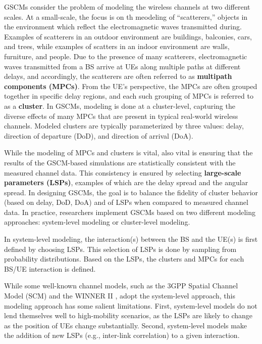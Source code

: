 GSCMs consider the problem of modeling the wireless channels at two different scales. At a small-scale, the focus is on th meodeling of ``scatterers,'' objects in the environment which reflect the electromagnetic waves transmitted during. Examples of scatterers in an outdoor environment are buildings, balconies, cars, and trees, while examples of scatters in an indoor environment are walls, furniture, and people. Due to the presence of many scatterers, electromagnetic waves transmitted from a BS arrive at UEs along multiple paths at different delays, and accordingly, the scatterers are often referred to as \textbf{multipath components (MPCs)}. From the UE's perspective, the MPCs are often grouped together in specific delay regions, and each such grouping of MPCs is referred to as a \textbf{cluster}. In GSCMs, modeling is done at a cluster-level, capturing the diverse effects of many MPCs that are present in typical real-world wireless channels. Modeled clusters are typically parameterized by three values: delay, direction of departure (DoD), and direction of arrival (DoA).  

While the modeling of MPCs and clusters is vital, also vital is ensuring that the results of the GSCM-based simulations are statistically consistent with the measured channel data. This consistency is ensured by selecting \textbf{large-scale parameters (LSPs)}, examples of which are the delay spread and the angular spread. In designing GSCMs, the goal is to balance the fidelity of cluster behavior (based on delay, DoD, DoA) and of LSPs when compared to measured channel data. In practice, researchers implement GSCMs based on two different modeling approaches: system-level modeling or cluster-level modeling.

In system-level modeling, the interaction(s) between the BS and the UE(s) is first defined by choosing LSPs. This selection of LSPs is done by sampling from probability distributions. Based on the LSPs, the clusters and MPCs for each BS/UE interaction is defined.

While some well-known channel models, such as the 3GPP Spatial Channel Model (SCM) \cite{ref:kyosti2007winner} and the WINNER II \cite{ref:kyosti2007winner}, adopt the system-level approach, this modeling approach has some salient limitations. First, system-level models do not lend themselves well to high-mobility scenarios, as the LSPs are likely to change as the position of UEs change substantially. Second, system-level models make the addition of new LSPs (e.g., inter-link correlation) to a given interaction.

